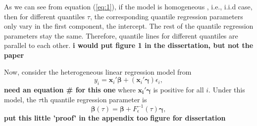 \documentclass[12pt]{article}
\DeclareMathOperator{\pr}{p}
\begin{document}
As we can see from equation (\ref{eq:1}), if the model is homogeneous
, i.e., i.i.d case, then for different quantiles $\tau$, the
corresponding quantile regression parameters only vary in the
first component, the intercept. The rest of the quantile regression
parameters stay the same. Therefore, quantile lines for different
quantiles are parallel to each other.
{\bf i would put figure 1 in the dissertation, but not the paper}


Now, consider the heterogeneous linear regression model  from \citep{he1998}
\begin{equation}\label{eq:8}
  y_i = \bm{x}_i'\bm{\beta} + (\bm{x}_i'\bm{\gamma}) \epsilon_i,
\end{equation}
{\bf need an equation \# for this one}
where $\bm{x_i'\gamma}$ is positive  for all
$i$. Under this model, the $\tau$th quantile regression parameter is
\begin{equation}\label{eq:2}
  \bm{\beta}(\tau) = \bm{\beta} + F^{-1}_{\epsilon}(\tau) \bm{\gamma},
\end{equation}
{\bf put this little 'proof' in the appendix too} %
{\bf figure for dissertation}
\end{document}

